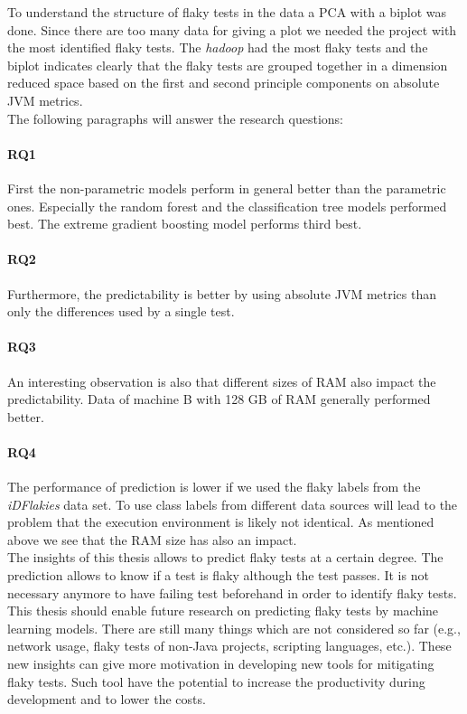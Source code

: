 \documentclass{seal_thesis}
\begin{document}
\noindent To understand the structure of flaky tests in the data a PCA with a biplot was done. Since there are too many data for giving a plot we needed the project with the most identified flaky tests. The \textit{hadoop} had the most flaky tests and the biplot indicates clearly that the flaky tests are grouped together in a dimension reduced space based on the first and second principle components on absolute JVM metrics. \\

\noindent The following paragraphs will answer the research questions:

\paragraph{RQ1} First the non-parametric models perform in general better than the parametric ones. Especially the random forest and the classification tree models performed best. The extreme gradient boosting model performs third best.

\paragraph{RQ2} Furthermore, the predictability is better by using absolute JVM metrics than only the differences used by a single test.

\paragraph{RQ3} An interesting observation is also that different sizes of RAM also impact the predictability. Data of machine B with 128 GB of RAM generally performed better. 

\paragraph{RQ4} The performance of prediction is lower if we used the flaky labels from the \textit{iDFlakies} data set. To use class labels from different data sources will lead to the problem that the execution environment is likely not identical. As mentioned above we see that the RAM size has also an impact. \\

\noindent The insights of this thesis allows to predict flaky tests at a certain degree. The prediction allows to know if a test is flaky although the test passes. It is not necessary anymore to have failing test beforehand in order to identify flaky tests. This thesis should enable future research on predicting flaky tests by machine learning models. There are still many things which are not considered so far (e.g., network usage, flaky tests of non-Java projects, scripting languages, etc.). These new insights can give more motivation in developing new tools for mitigating flaky tests. Such tool have the potential to increase the productivity during development and to lower the costs.
\end{document}
